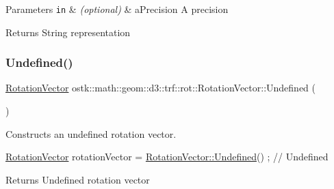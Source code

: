 \begin{DoxyParams}[1]{Parameters}
\mbox{\tt in}  & {\em (optional)} & a\+Precision A precision \\
\hline
\end{DoxyParams}
\begin{DoxyReturn}{Returns}
String representation 
\end{DoxyReturn}
\mbox{\label{classostk_1_1math_1_1geom_1_1d3_1_1trf_1_1rot_1_1_rotation_vector_ae0817d7a934343653d23c02e8aee9bc0}} 
\subsubsection{\texorpdfstring{Undefined()}{Undefined()}}
{\footnotesize\ttfamily \hyperlink{classostk_1_1math_1_1geom_1_1d3_1_1trf_1_1rot_1_1_rotation_vector}{Rotation\+Vector} ostk\+::math\+::geom\+::d3\+::trf\+::rot\+::\+Rotation\+Vector\+::\+Undefined (\begin{DoxyParamCaption}{ }\end{DoxyParamCaption})\hspace{0.3cm}{\ttfamily [static]}}



Constructs an undefined rotation vector. 


\begin{DoxyCode}
\hyperlink{classostk_1_1math_1_1geom_1_1d3_1_1trf_1_1rot_1_1_rotation_vector_ad05e6af649dbdd145793773e2ab1cdce}{RotationVector} rotationVector = \hyperlink{classostk_1_1math_1_1geom_1_1d3_1_1trf_1_1rot_1_1_rotation_vector_ae0817d7a934343653d23c02e8aee9bc0}{RotationVector::Undefined}() ; \textcolor{comment}{//
       Undefined}
\end{DoxyCode}


\begin{DoxyReturn}{Returns}
Undefined rotation vector 
\end{DoxyReturn}
\mbox{\label{classostk_1_1math_1_1geom_1_1d3_1_1trf_1_1rot_1_1_rotation_vector_a298536fda35c1f579a96dc5eaa003b37}} 
